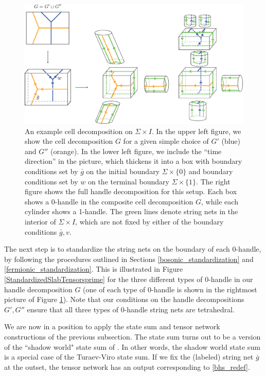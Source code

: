 \begin{figure}
\begin{centering}
\includegraphics[scale=.7]{VertexTypes.pdf}
\caption{\label{VertexTypes}
An example cell decomposition on $\Sigma \times I$. 
In the upper left figure, we show the cell decomposition $G$ for a given simple choice of $G'$ (blue) and $G''$ (orange). 
In the lower left figure, we include the ``time direction'' in the picture, which thickens it into a box with boundary conditions 
set by $\bar g$ on the initial boundary $\Sigma \times \{0\}$ and boundary conditions set by $w$ on the terminal boundary $\Sigma \times \{1\}$. 
The right figure shows the full handle decomposition for this setup. Each box shows a 0-handle in the composite cell decomposition $G$, 
while each cylinder shows a 1-handle. The green lines denote string nets in the interior of $\Sigma \times I$, which are not fixed 
by either of the boundary conditions $\bar g, v$.
}
\end{centering}
\end{figure}


The next step is to standardize the string nets on the boundary of each 0-handle, by following the procedures outlined in Sections \ref{bosonic_standardization} and \ref{fermionic_standardization}.
This is illustrated in Figure \ref{StandardizedSlabTensorsprime} for the three different types of 0-handle in our handle decomposition $G$ (one of each type of 0-handle is shown in the rightmost picture of Figure \ref{VertexTypes}).
Note that our conditions on the handle decompositions $G',G''$ ensure that all three types of 0-handle string nets are tetrahedral.

\medskip

We are now in a position to apply the state sum and tensor network constructions of the previous subsection.
The state sum turns out to be a version of the ``shadow world" state sum of \cite{kirillow1989,turaev2016quantum}. 
In other words, the shadow world state sum is a special case of the Turaev-Viro state sum.
If we fix the (labeled) string net $\bar g$ at the outset, the tensor network has an output corresponding to \eqref{bhs_redef}.

